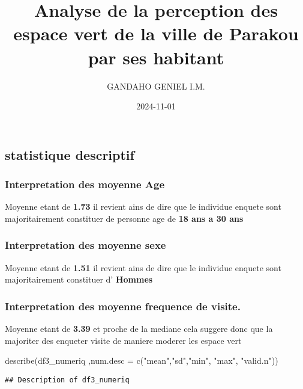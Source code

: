 \documentclass[
]{article}
\title{Analyse de la perception des espace vert de la ville de Parakou
par ses habitant}
\author{GANDAHO GENIEL I.M.}
\date{2024-11-01}
\newenvironment{Shaded}{}{}
\newcommand{\AttributeTok}[1]{#1}
\newcommand{\FunctionTok}[1]{#1}
\newcommand{\NormalTok}[1]{#1}
\newcommand{\StringTok}[1]{#1}
\begin{document}
\maketitle

{
\setcounter{tocdepth}{6}
\tableofcontents
}
\subsection{statistique descriptif}\label{statistique-descriptif}

\subsubsection{Interpretation des moyenne
Age}\label{interpretation-des-moyenne-age}

Moyenne etant de \textbf{1.73} il revient ains de dire que le individue
enquete sont majoritairement constituer de personne age de \textbf{18
ans a 30 ans}

\subsubsection{Interpretation des moyenne
sexe}\label{interpretation-des-moyenne-sexe}

Moyenne etant de \textbf{1.51} il revient ains de dire que le individue
enquete sont majoritairement constituer d' \textbf{Hommes}

\subsubsection{Interpretation des moyenne frequence de
visite.}\label{interpretation-des-moyenne-frequence-de-visite.}

Moyenne etant de \textbf{3.39} et proche de la mediane cela suggere donc
que la majoriter des enqueter visite de maniere moderer les espace vert

\begin{Shaded}
\begin{Highlighting}[]
\FunctionTok{describe}\NormalTok{(df3\_numeriq ,}\AttributeTok{num.desc =} \FunctionTok{c}\NormalTok{(}\StringTok{"mean"}\NormalTok{,}\StringTok{"sd"}\NormalTok{,}\StringTok{"min"}\NormalTok{, }\StringTok{"max"}\NormalTok{, }\StringTok{"valid.n"}\NormalTok{))}
\end{Highlighting}
\end{Shaded}

\begin{verbatim}
## Description of df3_numeriq
\end{verbatim}
\end{document}

